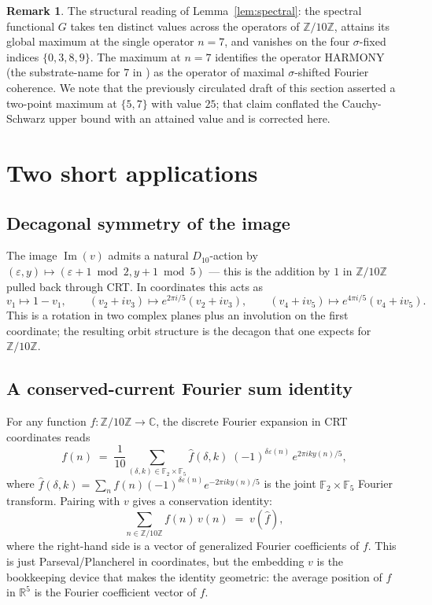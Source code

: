 \documentclass[11pt,reqno]{amsart}
\theoremstyle{definition}
\newtheorem{remark}[theorem]{Remark}
\newcommand{\Z}{\mathbb{Z}}
\newcommand{\R}{\mathbb{R}}
\newcommand{\C}{\mathbb{C}}
\newcommand{\F}{\mathbb{F}}
\DeclareMathOperator{\Img}{Im}
\begin{document}
\begin{remark}
\label{rem:G-structural}
The structural reading of Lemma~\ref{lem:spectral}: the spectral
functional $G$ takes ten distinct values across the operators of
$\Z/10\Z$, attains its global maximum at the single operator
$n = 7$, and vanishes on the four $\sigma$-fixed indices
$\{0, 3, 8, 9\}$. The maximum at $n = 7$ identifies the operator
HARMONY (the substrate-name for $7$ in
\cite{SandersGishFourCore}) as the operator of maximal
$\sigma$-shifted Fourier coherence. We note that the previously
circulated draft of this section asserted a two-point maximum at
$\{5, 7\}$ with value $25$; that claim conflated the
Cauchy-Schwarz upper bound with an attained value and is
corrected here.
\end{remark}

\section{Two short applications}
\label{sec:applications}

\subsection{Decagonal symmetry of the image}

The image $\Img(v)$ admits a natural $D_{10}$-action by
$(\varepsilon, y) \mapsto (\varepsilon + 1 \bmod 2,
y + 1 \bmod 5)$ — this is the addition by $1$ in
$\Z/10\Z$ pulled back through CRT. In coordinates this acts as
\[
  v_1 \mapsto 1 - v_1,
  \qquad
  (v_2 + i v_3) \mapsto e^{2\pi i / 5}(v_2 + i v_3),
  \qquad
  (v_4 + i v_5) \mapsto e^{4\pi i / 5}(v_4 + i v_5).
\]
This is a rotation in two complex planes plus an involution on the
first coordinate; the resulting orbit structure is the decagon
that one expects for $\Z/10\Z$.

\subsection{A conserved-current Fourier sum identity}

For any function $f : \Z/10\Z \to \C$, the discrete Fourier
expansion in CRT coordinates reads
\[
  f(n) \;=\; \frac{1}{10} \sum_{(\delta, k) \in \F_2 \times \F_5}
  \widehat{f}(\delta, k)\;
  (-1)^{\delta \varepsilon(n)} \, e^{2\pi i k y(n) / 5},
\]
where $\widehat{f}(\delta, k) = \sum_n f(n) (-1)^{\delta
\varepsilon(n)} e^{-2\pi i k y(n) / 5}$ is the joint
$\F_2 \times \F_5$ Fourier transform. Pairing with $v$ gives a
conservation identity:
\[
  \sum_{n \in \Z/10\Z} f(n) \, v(n) \;=\; v(\widehat{f}),
\]
where the right-hand side is a vector of generalized Fourier
coefficients of $f$. This is just Parseval/Plancherel in
coordinates, but the embedding $v$ is the bookkeeping device that
makes the identity geometric: the average position of $f$ in
$\R^5$ is the Fourier coefficient vector of $f$.
\end{document}
